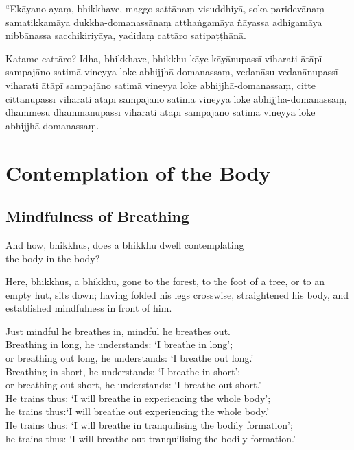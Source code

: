 “Ekāyano ayaṃ, bhikkhave, maggo sattānaṃ visuddhiyā, soka-paridevānaṃ
samatikkamāya dukkha-domanassānaṃ atthaṅgamāya ñāyassa adhigamāya nibbānassa
sacchikiriyāya, yadidaṃ cattāro satipaṭṭhānā.

Katame cattāro? Idha, bhikkhave, bhikkhu kāye kāyānupassī viharati ātāpī
sampajāno satimā vineyya loke abhijjhā-domanassaṃ, vedanāsu vedanānupassī
viharati ātāpī sampajāno satimā vineyya loke abhijjhā-domanassaṃ, citte
cittānupassī viharati ātāpī sampajāno satimā vineyya loke abhijjhā-domanassaṃ,
dhammesu dhammānupassī viharati ātāpī sampajāno satimā vineyya loke
abhijjhā-domanassaṃ.


\englishPage
\chapter{Contemplation of the Body}

\section{Mindfulness of Breathing}

And how, bhikkhus, does a bhikkhu dwell contemplating\\
the body in the body?

Here, bhikkhus, a bhikkhu, gone to the forest, to the foot of a tree, or to an
empty hut, sits down; having folded his legs crosswise, straightened his body,
and established mindfulness in front of him.

Just mindful he breathes in, mindful he breathes out.\\
Breathing in long, he understands: ‘I breathe in long’;\\
or breathing out long, he understands: ‘I breathe out long.’\\
Breathing in short, he understands: ‘I breathe in short’;\\
or breathing out short, he understands: ‘I breathe out short.’\\
He trains thus: ‘I will breathe in experiencing the whole body’;\\
he trains thus:‘I will breathe out experiencing the whole body.’\\
He trains thus: ‘I will breathe in tranquilising the bodily formation’;\\
he trains thus: ‘I will breathe out tranquilising the bodily formation.’

